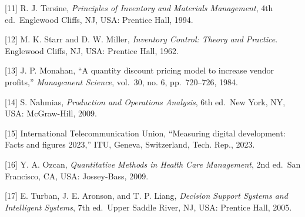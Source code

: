 ﻿\documentclass[conference]{IEEEtran}
\begin{document}
{[}11{]} R. J. Tersine, \emph{Principles of Inventory and Materials
Management}, 4th ed.~Englewood Cliffs, NJ, USA: Prentice Hall, 1994.

{[}12{]} M. K. Starr and D. W. Miller, \emph{Inventory Control: Theory
and Practice}. Englewood Cliffs, NJ, USA: Prentice Hall, 1962.

{[}13{]} J. P. Monahan, ``A quantity discount pricing model to increase
vendor profits,'' \emph{Management Science}, vol.~30, no. 6,
pp.~720--726, 1984.

{[}14{]} S. Nahmias, \emph{Production and Operations Analysis}, 6th
ed.~New York, NY, USA: McGraw-Hill, 2009.

{[}15{]} International Telecommunication Union, ``Measuring digital
development: Facts and figures 2023,'' ITU, Geneva, Switzerland, Tech.
Rep., 2023.

{[}16{]} Y. A. Ozcan, \emph{Quantitative Methods in Health Care
Management}, 2nd ed.~San Francisco, CA, USA: Jossey-Bass, 2009.

{[}17{]} E. Turban, J. E. Aronson, and T. P. Liang, \emph{Decision
Support Systems and Intelligent Systems}, 7th ed.~Upper Saddle River,
NJ, USA: Prentice Hall, 2005.



\end{document}
